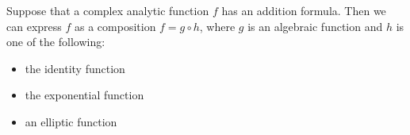 \documentclass[12pt]{article}
\begin{document}
Suppose that a complex analytic function $f$ has an addition formula.  Then we can express $f$ as a composition $f = g\circ h$, where $g$ is an algebraic function and $h$ is one of the following:
\begin{itemize}
\item the identity function
\item the exponential function
\item an elliptic function
\end{itemize}
\end{document}
